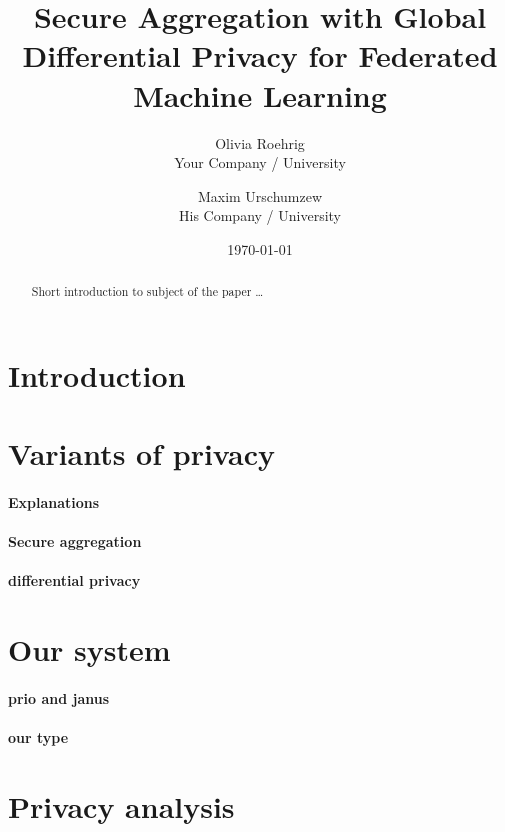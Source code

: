\documentclass{article}
\title{Secure Aggregation with Global Differential Privacy for Federated Machine Learning}
\author{Olivia Roehrig  \\
	Your Company / University  \\
	\and
	Maxim Urschumzew \\
	His Company / University \\
	}
\date{\today}
\begin{document}
\maketitle


\begin{abstract}
Short introduction to subject of the paper \ldots 
\end{abstract}

\section{Introduction}

\section{Variants of privacy}

\paragraph{Explanations}

\paragraph{Secure aggregation}

\paragraph{differential privacy}

\section{Our system}

\paragraph{prio and janus}

\paragraph{our type}

\section{Privacy analysis}

\end{document}
